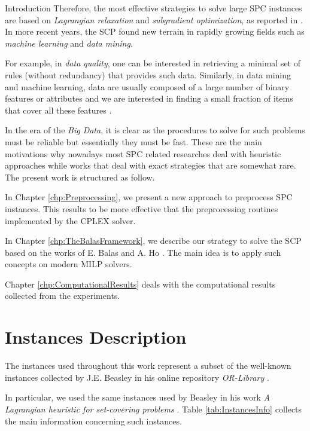 \documentclass[a4paper,12pt]{mydeitesi_eng}
\begin{document}
\begin{chapter}{Introduction}
Therefore, the most effective strategies to solve large SPC instances are based on \emph{Lagrangian relaxation} and \emph{subgradient optimization}, as reported in \cite{FischettiSCP}.\\

In more recent years, the SCP found new terrain in rapidly growing fields such as \emph{machine learning} and \emph{data mining}.

For example, in \emph{data quality}, one can be interested in retrieving a minimal set of rules (without redundancy) that provides such data.
Similarly, in data mining and machine learning, data are usually composed of a large number of binary features or attributes and we are interested in finding a small fraction of items that cover all these features \cite{SetCoveringGreedy}.

In the era of the \emph{Big Data}, it is clear as the procedures to solve for such problems must be reliable but essentially they must be fast.
These are the main motivations why nowadays most SPC related researches deal with heuristic approaches while works that deal with exact strategies that are somewhat rare.\\

The present work is structured as follow.

In Chapter \ref{chp:Preprocessing}, we present a new approach to preprocess SPC instances.
This results to be more effective that the preprocessing routines implemented by the CPLEX solver.

In Chapter \ref{chp:TheBalasFramework}, we describe our strategy to solve the SCP based on the works of E. Balas and A. Ho \cite{Balas1980-CuttinPlanes} \cite{Balas1980-Computational}.
The main idea is to apply such concepts on modern MILP solvers.

Chapter \ref{chp:ComputationalResults} deals with the computational results collected from the experiments.


\section{Instances Description}
\label{sec:InstancesDescription}

The instances used throughout this work represent a subset of the well-known instances collected by J.E. Beasley in his online repository \emph{OR-Library} \cite{OR-Lib}.

In particular, we used the same instances used by Beasley in his work \emph{A Lagrangian heuristic for set-covering problems} \cite{Beasley90}.
Table \ref{tab:InstancesInfo} collects the main information concerning such instances.


\end{chapter}
\end{document}
